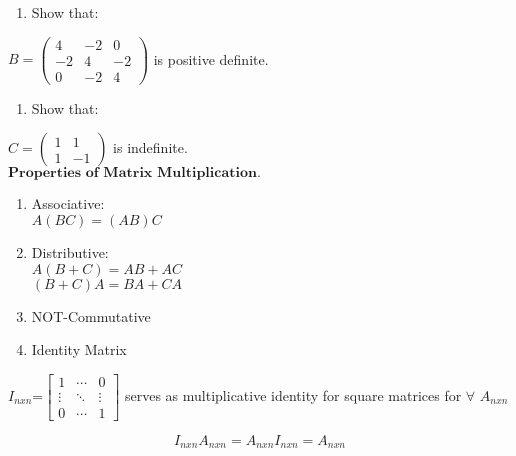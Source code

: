 \documentclass[]{article}
\providecommand{\tightlist}{%
  \setlength{\itemsep}{0pt}\setlength{\parskip}{0pt}}
\begin{document}
\begin{enumerate}
\def\labelenumi{\alph{enumi})}
\setcounter{enumi}{1}
\tightlist
\item
  Show that:\\
\end{enumerate}

\(B=\begin{pmatrix} 4 & -2 & 0\\ -2 & 4 & -2 \\ 0 & -2 & 4\end{pmatrix}\)
is positive definite.\\

\begin{enumerate}
\def\labelenumi{\alph{enumi})}
\setcounter{enumi}{2}
\tightlist
\item
  Show that:\\
\end{enumerate}

\(C=\begin{pmatrix} 1 & 1 \\ 1 & -1 \end{pmatrix}\) is indefinite.\\

\(\textbf{Properties of Matrix Multiplication.}\)\\

\begin{enumerate}
\def\labelenumi{\arabic{enumi}.}
\tightlist
\item
  Associative:\\
   \(A(BC)=(AB)C\)\\
\item
  Distributive:\\
   \(A(B+C)=AB+AC\)\\
   \((B+C)A=BA+CA\)\\
\item
  NOT-Commutative\\
\item
  Identity Matrix\\
\end{enumerate}

\(I_{nxn}\)=\(\begin{bmatrix} 1 & \cdots & 0 \\ \vdots & \ddots & \vdots \\ 0 & \cdots & 1 \end{bmatrix}\)
serves as multiplicative identity for square matrices for \(\forall\)
\(A_{nxn}\)

\[I_{nxn}A_{nxn}=A_{nxn}I_{nxn}=A_{nxn}\]\\
\end{document}
